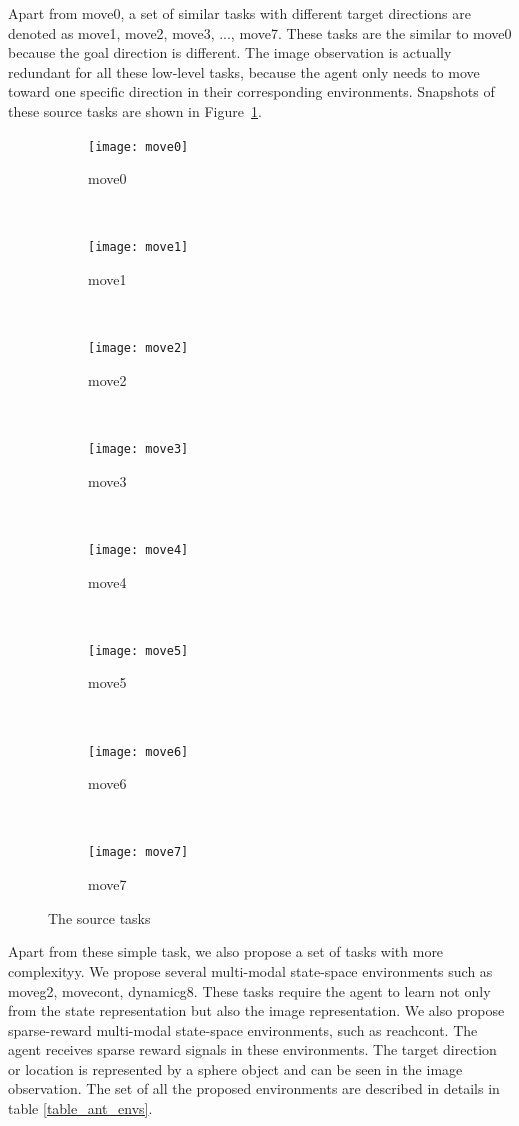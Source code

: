 Apart from move0, a set of similar tasks with different target directions are denoted as move1, move2, move3, ..., move7. These tasks are the similar to move0 because the goal direction is different. The image observation is actually redundant for all these low-level tasks, because the agent only needs to move toward one specific direction in their corresponding environments. Snapshots of these source tasks are shown in Figure~\ref{fig:task8}.
\begin{figure}[!htbp]
	\centering
	\begin{subfigure}[t]{0.3\textwidth}
		\centering
		\texttt{[image: move0]}
		\caption{move0}
	\end{subfigure}%
	~ 
	\begin{subfigure}[t]{0.3\textwidth}
		\centering
		\texttt{[image: move1]}
		\caption{move1}
	\end{subfigure}
	~ 
	\begin{subfigure}[t]{0.3\textwidth}
		\centering
		\texttt{[image: move2]}
		\caption{move2}
	\end{subfigure}
	~ 
	\begin{subfigure}[t]{0.3\textwidth}
		\centering
		\texttt{[image: move3]}
		\caption{move3}
	\end{subfigure}
	~ 
	\begin{subfigure}[t]{0.3\textwidth}
		\centering
		\texttt{[image: move4]}
		\caption{move4}
	\end{subfigure}
	~ 
	\begin{subfigure}[t]{0.3\textwidth}
		\centering
		\texttt{[image: move5]}
		\caption{move5}
	\end{subfigure}
	~ 
	\begin{subfigure}[t]{0.3\textwidth}
		\centering
		\texttt{[image: move6]}
		\caption{move6}
	\end{subfigure}
	~ 
	\begin{subfigure}[t]{0.3\textwidth}
		\centering
		\texttt{[image: move7]}
		\caption{move7}
	\end{subfigure}

	\caption{The source tasks}
	\label{fig:task8}
\end{figure}

Apart from these simple task, we also propose a set of tasks with more complexityy. We propose several multi-modal state-space environments such as moveg2, movecont, dynamicg8. These tasks require the agent to learn not only from the state representation but also the image representation. We also propose sparse-reward multi-modal state-space environments, such as reachcont. The agent receives sparse reward signals in these environments. The target direction or location is represented by a sphere object and can be seen in the image observation.
The set of all the proposed environments are described in details in table \ref{table_ant_envs}.


